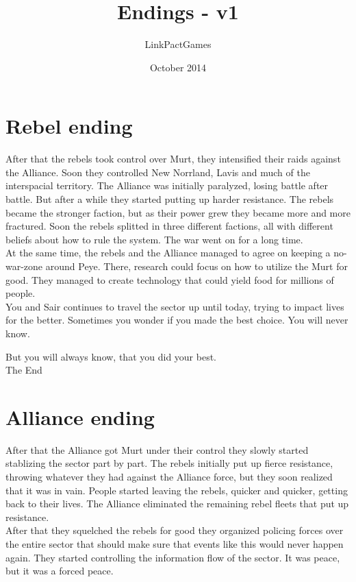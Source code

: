 \documentclass[a4paper,12pt]{article}
\begin{document}
\title{Endings - v1}
\author{LinkPactGames}
\date{October 2014}
\maketitle

\section{Rebel ending}

After that the rebels took control over Murt, they intensified their raids against the Alliance.
Soon they controlled New Norrland, Lavis and much of the interspacial territory.
The Alliance was initially paralyzed, losing battle after battle. But after a while they started
putting up harder resistance.
The rebels became the stronger faction, but as their power grew they became more and more fractured.
Soon the rebels splitted in three different factions, all with different beliefs about how to rule the system.
The war went on for a long time.\\

At the same time, the rebels and the Alliance managed to agree on keeping a no-war-zone around Peye.
There, research could focus on how to utilize the Murt for good. They managed to create technology that
could yield food for millions of people.\\

You and Sair continues to travel the sector up until today, trying to impact lives for the better.
Sometimes you wonder if you made the best choice. You will never know. 

But you will always know, that you did your best.\\

The End

\section{Alliance ending}

After that the Alliance got Murt under their control they slowly started stablizing the sector part by part.
The rebels initially put up fierce resistance, throwing whatever they had against the Alliance force, but they
soon realized that it was in vain. People started leaving the rebels, quicker and quicker, getting back to their lives.
The Alliance eliminated the remaining rebel fleets that put up resistance.\\

After that they squelched the rebels for good they organized policing forces over the entire sector that should
make sure that events like this would never happen again. They started controlling the information flow of the sector.
It was peace, but it was a forced peace.\\
\end{document}
